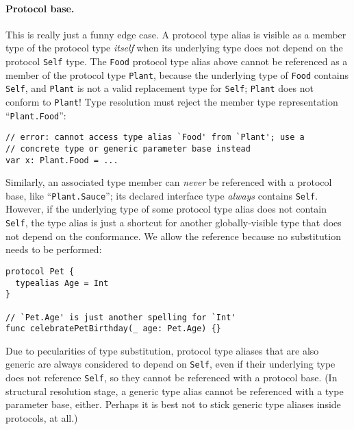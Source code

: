 \documentclass[../generics]{subfiles}
\begin{document}
\paragraph{Protocol base.} This is really just a funny edge case. A protocol type alias is visible as a member type of the protocol type \emph{itself} when its underlying type does not depend on the protocol \texttt{Self} type. The \texttt{Food} protocol type alias above cannot be referenced as a member of the protocol type \texttt{Plant}, because the underlying type of \texttt{Food} contains \texttt{Self}, and \texttt{Plant} is not a valid replacement type for \texttt{Self}; \texttt{Plant} does not conform to \texttt{Plant}! Type resolution must reject the member type representation ``\texttt{Plant.Food}'':
\begin{Verbatim}
// error: cannot access type alias `Food' from `Plant'; use a
// concrete type or generic parameter base instead
var x: Plant.Food = ...
\end{Verbatim}
Similarly, an associated type member can \emph{never} be referenced with a protocol base, like ``\texttt{Plant.Sauce}''; its declared interface type \emph{always} contains \texttt{Self}. However, if the underlying type of some protocol type alias does not contain \texttt{Self}, the type alias is just a shortcut for another globally-visible type that does not depend on the conformance. We allow the reference because no substitution needs to be performed:
\begin{Verbatim}
protocol Pet {
  typealias Age = Int
}

// `Pet.Age' is just another spelling for `Int'
func celebratePetBirthday(_ age: Pet.Age) {}
\end{Verbatim}

Due to pecularities of type substitution, protocol type aliases that are also generic are always considered to depend on \texttt{Self}, even if their underlying type does not reference \texttt{Self}, so they cannot be referenced with a protocol base. (In structural resolution stage, a generic type alias cannot be referenced with a type parameter base, either. Perhaps it is best not to stick generic type aliases inside protocols, at all.)
\end{document}
